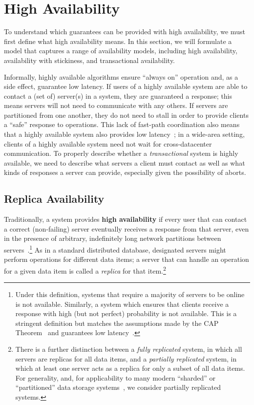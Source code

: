 
\section{High Availability}
\label{sec:availability}

To understand which guarantees can be provided with high availability,
we must first define what high availability means. In this section, we
will formulate a model that captures a range of availability models,
including high availability, availability with stickiness, and
transactional availability.

Informally, highly available algorithms ensure ``always on'' operation
and, as a side effect, guarantee low latency. If users of a highly
available system are able to contact a (set of) server(s) in a system,
they are guaranteed a response; this means servers will not need to
communicate with any others. If servers are partitioned from one
another, they do not need to stall in order to provide clients a
``safe'' response to operations. This lack of fast-path coordination
also means that a highly available system also provides low
latency~\cite{abadi-pacelc}; in a wide-area setting, clients of a
highly available system need not wait for cross-datacenter
communication. To properly describe whether a \textit{transactional}
system is highly available, we need to describe what servers a client
must contact as well as what kinds of responses a server can provide,
especially given the possibility of aborts.

\subsection{Replica Availability}

Traditionally, a system provides {\textbf{high availability}} if every user
that can contact a correct (non-failing) server eventually receives a
response from that server, even in the presence of arbitrary,
indefinitely long network partitions between
servers~\cite{gilbert-cap}.\footnote{Under this definition, systems
  that require a majority of servers to be online is not
  available. Similarly, a system which ensures that clients receive a
  response with high (but not perfect) probability is not
  available. This is a stringent definition but matches the
  assumptions made by the CAP Theorem~\cite{gilbert-cap} and
  guarantees low latency~\cite{abadi-pacelc}.} As in a standard
distributed database, designated servers might perform operations for
different data items; a server that can handle an operation for a
given data item is called a \textit{replica} for that
item.\footnote{There is a further distinction between a \textit{fully
    replicated} system, in which all servers are replicas for all data
  items, and a \textit{partially replicated} system, in which at least
  one server acts as a replica for only a subset of all data
  items. For generality, and, for applicability to many modern
  ``sharded'' or ``partitioned'' data storage systems~\cite{ bigtable,
    pnuts, spanner, dynamo, hstore}, we consider partially replicated
  systems.}

